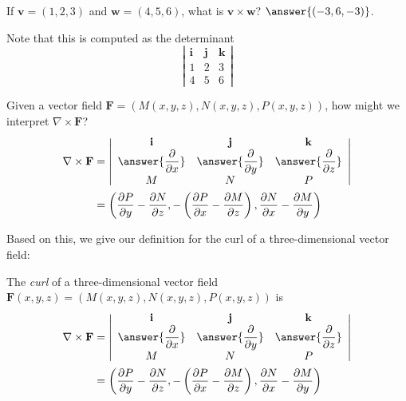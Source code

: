 \documentclass{ximera}
\begin{document}
\begin{problem}
If $\mathbf{v}=(1,2,3)$ and $\mathbf{w}=(4,5,6)$, what is $\mathbf{v}\times\mathbf{w}$?
$\answer{(-3,6,-3)}$.
\begin{problem}
Note that this is computed as the determinant
\[
\left|\begin{array}{ccc}
\mathbf{i}&\mathbf{j}&\mathbf{k}\\
1&2&3\\
4&5&6
\end{array}\right|
\]
\begin{problem}
Given a vector field $\mathbf{F}=(M(x,y,z),N(x,y,z),P(x,y,z))$, how might we interpret $\nabla\times\mathbf{F}$?
\begin{align*}
\nabla\times\mathbf{F} &= \left|\begin{array}{ccc}
\mathbf{i}&\mathbf{j}&\mathbf{k}\\
\answer{\dfrac{\partial}{\partial x}}&\answer{\dfrac{\partial}{\partial y}}&\answer{\dfrac{\partial}{\partial z}}\\
M&N&P
\end{array}\right|\\
&= \left(\dfrac{\partial P}{\partial y}-\dfrac{\partial N}{\partial z}, -\left(\dfrac{\partial P}{\partial x}-\dfrac{\partial M}{\partial z}\right), \dfrac{\partial N}{\partial x} - \dfrac{\partial M}{\partial y}\right)
\end{align*}
\end{problem}
\end{problem}
\end{problem}

Based on this, we give our definition for the curl of a three-dimensional vector field:

\begin{definition}
The \emph{curl} of a three-dimensional vector field $\mathbf{F}(x,y,z) = (M(x,y,z), N(x,y,z), P(x,y,z))$ is
\begin{align*}
\nabla\times\mathbf{F} &= \left|\begin{array}{ccc}
\mathbf{i}&\mathbf{j}&\mathbf{k}\\
\answer{\dfrac{\partial}{\partial x}}&\answer{\dfrac{\partial}{\partial y}}&\answer{\dfrac{\partial}{\partial z}}\\
M&N&P
\end{array}\right|\\
&= \left(\dfrac{\partial P}{\partial y}-\dfrac{\partial N}{\partial z}, -\left(\dfrac{\partial P}{\partial x}-\dfrac{\partial M}{\partial z}\right), \dfrac{\partial N}{\partial x} - \dfrac{\partial M}{\partial y}\right)
\end{align*}
\end{definition}
\end{document}
